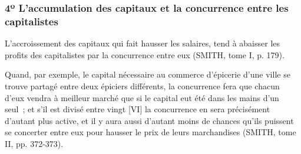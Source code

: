 \documentclass[french,twoside]{book} %
\newenvironment{quoteblock}%
  {\begin{quoting}}
  {\end{quoting}}
\newenvironment{quotebar}{%
    \def\FrameCommand{{\color{rubric!10!}\vrule width 0.5em} \hspace{0.9em}}%
    \def\OuterFrameSep{\itemsep} %
    \MakeFramed {\advance\hsize-\width \FrameRestore}
  }%
  {%
    \endMakeFramed
  }
\renewenvironment{quoteblock}%
  {%
    \savenotes
    \setstretch{0.9}
    \normalfont
    \begin{quotebar}
  }
  {%
    \end{quotebar}
    \spewnotes
  }
\begin{document}
\subsubsection[{4º L’accumulation des capitaux et la concurrence entre les capitalistes}]{4º L’accumulation des capitaux et la concurrence entre les capitalistes}

\begin{quoteblock}
 \noindent L’accroissement des capitaux qui fait hausser les salaires, tend à abaisser les profits des capitalistes par la concurrence entre eux (SMITH, tome I, p. 179).\par
 Quand, par exemple, le capital nécessaire au commerce d’épicerie d’une ville se trouve partagé entre deux épiciers différents, la concurrence fera que chacun d’eux vendra à meilleur marché que si le capital eut été dans les mains d’un seul ; et s’il est divisé entre vingt [VI] la concurrence en sera précisément d’autant plus active, et il y aura aussi d’autant moins de chances qu’ils puissent se concerter entre eux pour hausser le prix de leurs marchandises (SMITH, tome II, pp. 372-373).
 \end{quoteblock}
\end{document}
